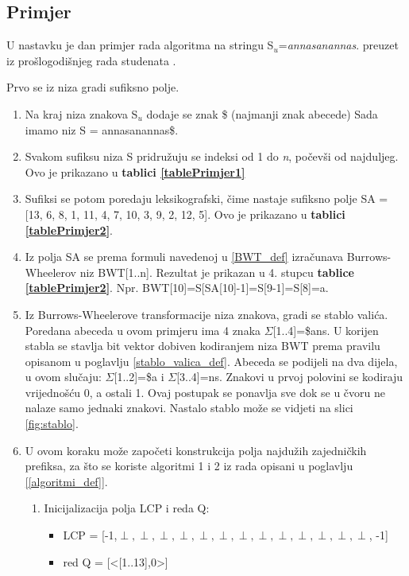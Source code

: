 \documentclass[times, utf8, seminar]{fer}
\begin{document}
\subsection{Primjer}
\label{chptr_primjer}
U nastavku je dan primjer rada algoritma na stringu S$_u$=\textit{annasanannas}. preuzet iz prošlogodišnjeg rada studenata \cite{studenti2016}.

Prvo se iz niza gradi sufiksno polje. 


\begin{enumerate}
  \item Na kraj niza znakova S$_u$ dodaje se znak \$ (najmanji znak abecede) Sada imamo niz S = annasanannas\$.
  \item Svakom sufiksu niza S pridružuju se indeksi od 1 do \textit{n}, počevši od najduljeg. Ovo je prikazano u \textbf{tablici \ref{tablePrimjer1}}
  \item Sufiksi se potom poredaju leksikografski, čime nastaje sufiksno polje SA = [13, 6, 8, 1, 11, 4, 7, 10, 3, 9, 2, 12, 5]. Ovo je prikazano u \textbf{tablici \ref{tablePrimjer2}}.
  \item Iz polja SA se prema formuli navedenoj u \ref{BWT_def} izračunava Burrows-Wheelerov niz BWT[1..n]. 
  Rezultat je prikazan u 4. stupcu \textbf{tablice \ref{tablePrimjer2}}. 
  Npr. BWT[10]=S[SA[10]-1]=S[9-1]=S[8]=a.
  \item Iz Burrows-Wheelerove transformacije niza znakova, gradi se stablo valića. Poredana abeceda u ovom primjeru ima 4 znaka $\Sigma$[1..4]=\$ans. U korijen stabla se stavlja bit vektor dobiven kodiranjem niza BWT prema pravilu opisanom u poglavlju \ref{stablo_valica_def}. Abeceda se podijeli na dva dijela, u ovom slučaju: $\Sigma$[1..2]=\$a i $\Sigma$[3..4]=ns. Znakovi u prvoj polovini se kodiraju vrijednošću 0, a ostali 1. Ovaj postupak se ponavlja sve dok se u čvoru ne nalaze samo jednaki znakovi. Nastalo stablo može se vidjeti na slici \ref{fig:stablo}.
  \item U ovom koraku može započeti konstrukcija polja najdužih zajedničkih prefiksa, za što se koriste algoritmi 1 i 2 iz rada \cite{beller2013} opisani u poglavlju \ref{[algoritmi_def]}.
  \begin{enumerate}
  \item Inicijalizacija polja LCP i reda Q:
  \begin{itemize}
  \item LCP = [-1,$\perp,\perp,\perp,\perp,\perp,\perp,\perp,\perp,\perp,\perp,\perp,\perp, \perp$, -1]
  \item red Q = [<[1..13],0>]

\end{itemize}
\end{enumerate}
\end{enumerate}
\end{document}
